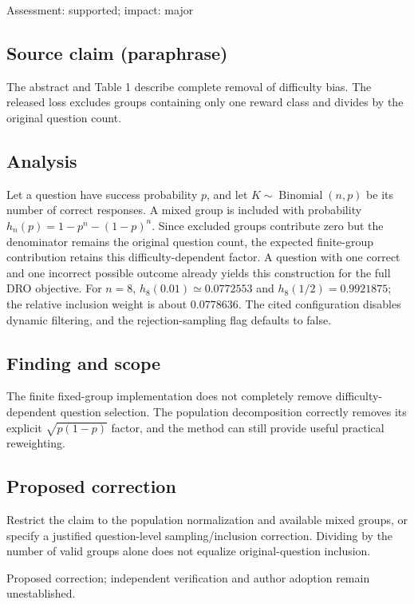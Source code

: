 \documentclass[11pt]{article}
\begin{document}
Assessment: supported; impact: major

\subsection*{Source claim (paraphrase)}

The abstract and Table 1 describe complete removal of difficulty bias. The released loss excludes groups containing only one reward class and divides by the original question count.

\subsection*{Analysis}

Let a question have success probability \(p\), and let \(K\sim\operatorname{Binomial}(n,p)\) be its number of correct responses. A mixed group is included with probability \(h_n(p)=1-p^n-(1-p)^n\). Since excluded groups contribute zero but the denominator remains the original question count, the expected finite-group contribution retains this difficulty-dependent factor. A question with one correct and one incorrect possible outcome already yields this construction for the full DRO objective. For \(n=8\), \(h_8(0.01)\simeq0.0772553\) and \(h_8(1/2)=0.9921875\); the relative inclusion weight is about \(0.0778636\). The cited configuration disables dynamic filtering, and the rejection-sampling flag defaults to false.

\subsection*{Finding and scope}

The finite fixed-group implementation does not completely remove difficulty-dependent question selection. The population decomposition correctly removes its explicit \(\sqrt{p(1-p)}\) factor, and the method can still provide useful practical reweighting.

\subsection*{Proposed correction}

Restrict the claim to the population normalization and available mixed groups, or specify a justified question-level sampling/inclusion correction. Dividing by the number of valid groups alone does not equalize original-question inclusion.

Proposed correction; independent verification and author adoption remain unestablished.
\end{document}
